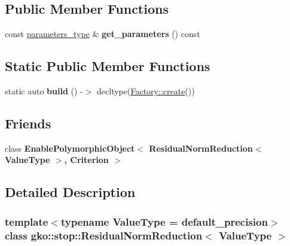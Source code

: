 \subsection*{Public Member Functions}
\begin{DoxyCompactItemize}
\item 
\mbox{\label{classgko_1_1stop_1_1ResidualNormReduction_aa5a5af284c81a179256da9cf191c9f17}} 
const \hyperlink{structgko_1_1stop_1_1ResidualNormReduction_1_1parameters__type}{parameters\+\_\+type} \& {\bfseries get\+\_\+parameters} () const
\end{DoxyCompactItemize}
\subsection*{Static Public Member Functions}
\begin{DoxyCompactItemize}
\item 
\mbox{\label{classgko_1_1stop_1_1ResidualNormReduction_a23e717a726a5b8a2fd761296471c15de}} 
static auto {\bfseries build} () -\/$>$ decltype(\hyperlink{classgko_1_1EnableDefaultFactory_a1d077101d9e788e6c65f088612d14cc3}{Factory\+::create}())
\end{DoxyCompactItemize}
\subsection*{Friends}
\begin{DoxyCompactItemize}
\item 
\mbox{\label{classgko_1_1stop_1_1ResidualNormReduction_aef2f52d8e5cedbae7f8132d5be88132c}} 
class {\bfseries Enable\+Polymorphic\+Object$<$ Residual\+Norm\+Reduction$<$ Value\+Type $>$, Criterion $>$}
\end{DoxyCompactItemize}


\subsection{Detailed Description}
\subsubsection*{template$<$typename Value\+Type = default\+\_\+precision$>$\newline
class gko\+::stop\+::\+Residual\+Norm\+Reduction$<$ Value\+Type $>$}

